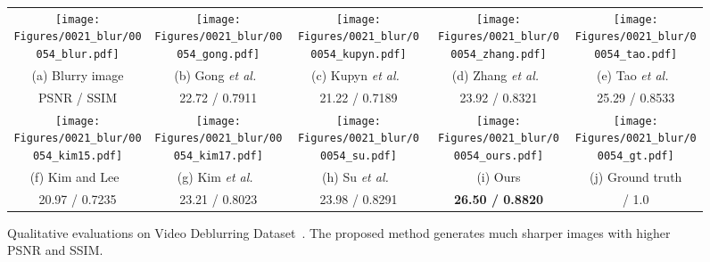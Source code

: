 \documentclass[10pt,twocolumn,letterpaper]{article}
\begin{document}
\begin{figure*}[h]\footnotesize
\centering
\renewcommand{\tabcolsep}{1pt}
\renewcommand{\arraystretch}{1}
\begin{center}
	\begin{tabular}{ccccc}
		\texttt{[image: Figures/0021\_blur/00054\_blur.pdf]} &
		\texttt{[image: Figures/0021\_blur/00054\_gong.pdf]} &
		\texttt{[image: Figures/0021\_blur/00054\_kupyn.pdf]} &
		\texttt{[image: Figures/0021\_blur/00054\_zhang.pdf]} &	
		\texttt{[image: Figures/0021\_blur/00054\_tao.pdf]} \\		
		(a) Blurry image & (b) Gong \textit{et al.}~\cite{gong2017motion} & (c) Kupyn \textit{et al.}~\cite{kupyn2018deblurgan} & (d) Zhang \textit{et al.}~\cite{zhang2018dynamic}& (e) Tao \textit{et al.}~\cite{tao2018scale} \\
		PSNR / SSIM  &  22.72 / 0.7911  & 21.22 / 0.7189  &  23.92 / 0.8321 & 25.29 / 0.8533
\vspace{1.5pt}\\
\texttt{[image: Figures/0021\_blur/00054\_kim15.pdf]} &
		\texttt{[image: Figures/0021\_blur/00054\_kim17.pdf]} &
		\texttt{[image: Figures/0021\_blur/00054\_su.pdf]} &
		\texttt{[image: Figures/0021\_blur/00054\_ours.pdf]} &	
		\texttt{[image: Figures/0021\_blur/00054\_gt.pdf]} \\		
		(f) Kim and Lee~\cite{hyun2015generalized} & (g) Kim \textit{et al.}~\cite{hyun2017online} & (h) Su \textit{et al.}~\cite{su2017deep} & (i) Ours & (j) Ground truth \\
		20.97 / 0.7235  &  23.21 / 0.8023  & 23.98 / 0.8291  & \textbf{26.50 / 0.8820} &  / 1.0 \\
	\end{tabular}
\end{center}
\vspace{-3mm}
\caption{Qualitative evaluations on Video Deblurring Dataset~\cite{su2017deep}. The proposed method generates much sharper images with higher PSNR and SSIM.}
\label{fig:show_test}
\vspace{-2mm}
\end{figure*}
\end{document}
